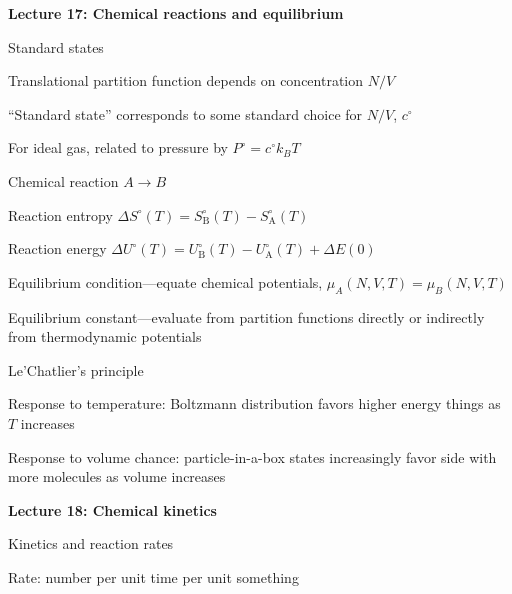 \documentclass[11pt]{article}
\begin{document}
\begin{outline}
    \item {\bf Lecture 17: Chemical reactions and equilibrium}
      \begin{outline}
      \item Standard states
        \begin{outline}
          \item Translational partition function depends on concentration $N/V$
          \item ``Standard state'' corresponds to some standard choice for $N/V$, $c^\circ$
          \item For ideal gas, related to pressure by $P^\circ = c^\circ k_B T$
        \end{outline}
      \item Chemical reaction $A \rightarrow B$
      \item Reaction entropy $\Delta S^\circ (T) =  S^\circ_\mathrm{B}(T)-S^\circ_\mathrm{A}(T)$
        \item Reaction energy $\Delta U^\circ (T) =
          U^\circ_\mathrm{B}(T)-U^\circ_\mathrm{A}(T)+\Delta E(0)$
        \item Equilibrium condition---equate chemical potentials, $\mu_A(N,V,T) = \mu_B(N,V,T)$
        \item Equilibrium constant---evaluate from partition functions directly
          or indirectly from thermodynamic potentials
\item Le'Chatlier's principle
  \begin{outline}
    \item Response to temperature: Boltzmann distribution favors higher energy
      things as $T$ increases
    \item Response to volume chance: particle-in-a-box states increasingly favor
      side with more molecules as volume increases 
  \end{outline}
\end{outline}
\item {\bf Lecture 18: Chemical kinetics}
  \begin{outline}
  \item Kinetics and reaction rates
    \begin{outline}
      \item Rate: number per unit time per unit something
    \end{outline}


\end{outline}
\end{outline}
\end{document}
